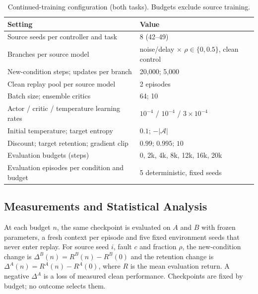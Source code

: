 \documentclass[runningheads]{llncs}
\begin{document}
\begin{table}[t]
\caption{Continued-training configuration (both tasks). Budgets exclude source training.}
\label{tab:config}
\centering\small
\begin{tabular}{@{}p{}p{}@{}}
\toprule
Setting & Value \\
\midrule
Source seeds per controller and task & 8 (42--49) \\
Branches per source model & noise/delay $\times$ $\rho\in\{0,0.5\}$, clean control \\
New-condition steps; updates per branch & 20,000; 5,000 \\
Clean replay pool per source model & 2 episodes \\
Batch size; ensemble critics & 64; 10 \\
Actor / critic / temperature learning rates & $10^{-4}$ / $10^{-4}$ / $3\!\times\!10^{-4}$ \\
Initial temperature; target entropy & $0.1$; $-|\mathcal{A}|$ \\
Discount; target retention; gradient clip & $0.99$; $0.995$; $10$ \\
Evaluation budgets (steps) & 0, 2k, 4k, 8k, 12k, 16k, 20k \\
Evaluation episodes per condition and budget & 5 deterministic, fixed seeds \\
\bottomrule
\end{tabular}
\end{table}

\subsection{Measurements and Statistical Analysis}
At each budget $n$, the same checkpoint is evaluated on $A$ and $B$ with frozen parameters, a fresh context per episode and five fixed environment seeds that never enter replay. For source seed $i$, fault $c$ and fraction $\rho$, the new-condition change is $\Delta^B(n)=R^B(n)-R^B(0)$ and the retention change is $\Delta^A(n)=R^A(n)-R^A(0)$, where $R$ is the mean evaluation return. A negative $\Delta^A$ is a loss of measured clean performance. Checkpoints are fixed by budget; no outcome selects them.
\end{document}
